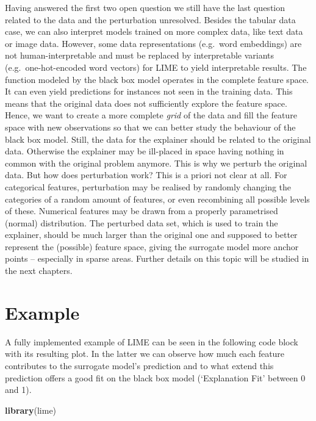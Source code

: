 \documentclass[
]{krantz}
\newenvironment{Shaded}{\begin{snugshade}}{\end{snugshade}}
\newcommand{\KeywordTok}[1]{\textcolor[rgb]{0.13,0.29,0.53}{\textbf{#1}}}
\newcommand{\NormalTok}[1]{#1}
\begin{document}
Having answered the first two open question we still have the last question related to the data and the perturbation unresolved.
Besides the tabular data case, we can also interpret models trained on more complex data, like text data or image data.
However, some data representations (e.g.~word embeddings) are not human-interpretable and must be replaced by interpretable variants (e.g.~one-hot-encoded word vectors) for LIME to yield interpretable results.
The function modeled by the black box model operates in the complete feature space.
It can even yield predictions for instances not seen in the training data.
This means that the original data does not sufficiently explore the feature space.
Hence, we want to create a more complete \emph{grid} of the data and fill the feature space with new observations so that we can better study the behaviour of the black box model.
Still, the data for the explainer should be related to the original data.
Otherwise the explainer may be ill-placed in space having nothing in common with the original problem anymore.
This is why we perturb the original data.
But how does perturbation work?
This is a priori not clear at all.
For categorical features, perturbation may be realised by randomly changing the categories of a random amount of features, or even recombining all possible levels of these.
Numerical features may be drawn from a properly parametrised (normal) distribution.
The perturbed data set, which is used to train the explainer, should be much larger than the original one and supposed to better represent the (possible) feature space, giving the surrogate model more anchor points -- especially in sparse areas.
Further details on this topic will be studied in the next chapters.

\hypertarget{example}{%
\section{Example}\label{example}}

A fully implemented example of LIME can be seen in the following code block with its resulting plot. In the latter we can observe how much each feature contributes to the surrogate model's prediction and to what extend this prediction offers a good fit on the black box model (`Explanation Fit' between 0 and 1).

\begin{Shaded}
\begin{Highlighting}[]
\KeywordTok{library}\NormalTok{(lime)}
\end{Highlighting}
\end{Shaded}
\end{document}
